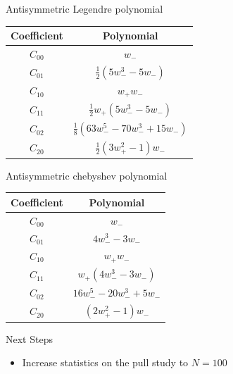 

\begin{frame}{Antisymmetric Legendre polynomial}
\begin{center}
\begin{tabular}{|c|c|}
Coefficient & Polynomial \\ \hline

$C_{00}$ & $w_-$ \\
$C_{01}$ & $\frac{1}{2} \left(5 w_-^3 - 5 w_-\right)$ \\
$C_{10}$ & $ w_+ w_-$ \\
$C_{11}$ & $ \frac{1}{2} w_+  \left(5 w_-^3 - 5 w_-\right)$\\
$C_{02}$ & $\frac{1}{8}\left(63 w_-^5 - 70 w_-^3 + 15 w_-\right)$ \\
$C_{20}$ & $\frac{1}{2} \left(3 w_+^2 - 1\right) w_-$

\end{tabular}
\end{center}
\end{frame}


\begin{frame}{Antisymmetric chebyshev polynomial}
\begin{center}
\begin{tabular}{|c|c|}
Coefficient & Polynomial \\ \hline

$C_{00}$ & $w_-$ \\
$C_{01}$ & $4 w_-^3 - 3 w_-$ \\
$C_{10}$ & $ w_+ w_-$ \\
$C_{11}$ & $ w_+ \left(4 w_-^3 - 3 w_-\right)$\\
$C_{02}$ & $16 w_-^5 - 20 w_-^3 + 5 w_-$ \\
$C_{20}$ & $\left(2 w_+^2 - 1\right) w_-$

\end{tabular}
\end{center}
\end{frame}


\begin{frame}{Next Steps}
\begin{itemize}
\item Increase statistics on the pull study to $N=100$
\end{itemize}
\end{frame}


